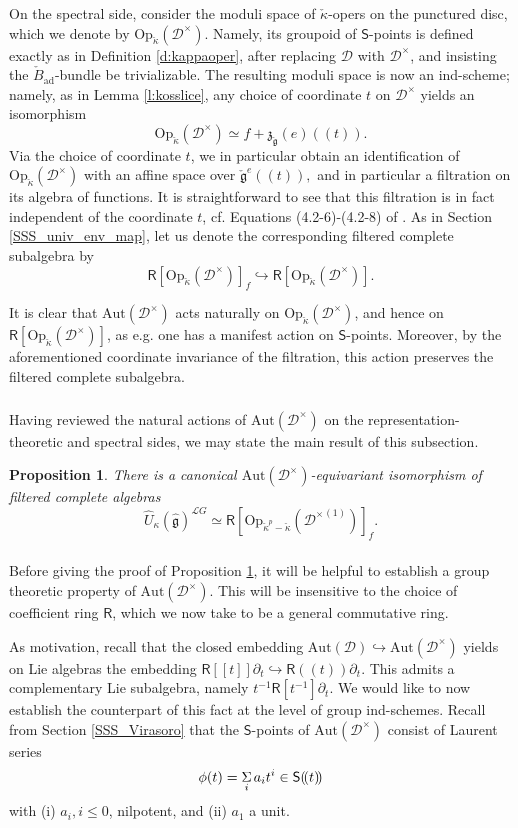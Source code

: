 \documentclass{amsart}
\newtheorem{Prop}[Thm]{Proposition}
\theoremstyle{definition}
\newcommand{\sss}{\subsubsection{}}
\newcommand{\fg}{\mathfrak{g}}
\newcommand{\fr}{^\on{(1)}}
\newcommand{\D}{\sD}
\newcommand{\sD}{\mathscr{D}}
\newcommand{\Sing}{\mathsf{S}}
\newcommand{\on}{\mathrm}
\newcommand{\Ring}{\mathsf{R}}
\newcommand{\Loop}{\mathscr{L}}
\newcommand{\pD}{\sD^\times}
\newcommand{\ckappa}{\check{\kappa}}
\newcommand{\Op}{\on{Op}}
\newcommand{\Aut}{\on{Aut}}
\numberwithin{equation}{section}
\begin{document}
\sss{} \label{sss:operspd} On the spectral side, consider the moduli space of $\ckappa$-opers on the punctured disc, which we denote by $\Op_{\ckappa}(\pD)$. Namely, its groupoid of $\Sing$-points is defined exactly as in Definition \ref{d:kappaoper}, after replacing $\sD$ with $\pD$, and insisting the $\check{B}_{\on{ad}}$-bundle be trivializable. The resulting moduli space is now an ind-scheme; namely, as in Lemma \ref{l:kosslice}, any choice of coordinate $t$ on $\pD$ yields an isomorphism 
$$\Op_{\ckappa}(\pD) \simeq f + \mathfrak{z}_{\check{\fg}}(e)(\!(t)\!).$$
Via the choice of coordinate $t$, we in particular obtain an identification of $\Op_{\ckappa}(\pD)$ with an affine space over $\check{\fg}^e(\!(t)\!),$ and in particular a filtration on its algebra of functions. It is straightforward to see that this filtration is in fact independent of the coordinate $t$, cf. Equations (4.2-6)-(4.2-8) of \cite{Frenkel_loop}. As in Section \ref{SSS_univ_env_map}, let us denote the corresponding filtered complete subalgebra by 
$$\Ring[\Op_{\ckappa}(\pD)]_f \hookrightarrow \Ring[\Op_{\ckappa}(\pD)].$$

It is clear that $\Aut(\pD)$ acts naturally on $\Op_{\ckappa}(\pD)$, and hence on $\Ring[\Op_{\ckappa}(\pD)]$, as e.g. one has a manifest action on $\Sing$-points. Moreover, by the aforementioned coordinate invariance of the filtration, this action preserves the filtered complete subalgebra. 


\sss{} Having reviewed the natural actions of $\Aut(\pD)$ on the representation-theoretic and spectral sides, we may state the main result of this subsection.

\begin{Prop} \label{p:coordinvariancepD} There is a canonical $\Aut(\pD)$-equivariant isomorphism of filtered complete algebras
\begin{equation} \label{e:coordinvhc} \widehat{U}_\kappa(\hat{\fg})^{\Loop G} \simeq \Ring[\Op_{\ckappa^p - \ckappa}({\pD}\fr)]_f.\end{equation}
\end{Prop}

\sss{} Before giving the proof of Proposition \ref{p:coordinvariancepD}, it will be helpful to establish a group theoretic property of $\Aut(\pD)$. This will be insensitive to the choice of coefficient ring $\Ring$, which we now take to be a general commutative ring. 

As motivation, recall that the closed embedding $\Aut(\D) \hookrightarrow \Aut(\pD)$ yields on Lie algebras the embedding $\Ring[[t]]\partial_t \hookrightarrow \Ring (\!(t)\!)\partial_t$. This admits a complementary Lie subalgebra, namely $t^{-1}\Ring[t^{-1}]\partial_t$. We would like to now establish the counterpart of this fact at the level of group ind-schemes. Recall from Section \ref{SSS_Virasoro} that the $\Sing$-points of $\Aut(\pD)$ consist of Laurent series \begin{equation} \label{e:phi} \phi(t) = \underset{i} \Sigma \hspace{.5mm} a_i t^i \in \Sing(\!(t)\!)\end{equation}with (i) $a_i, i \leqslant 0$, nilpotent, and (ii) $a_1$ a unit. 
\end{document}
